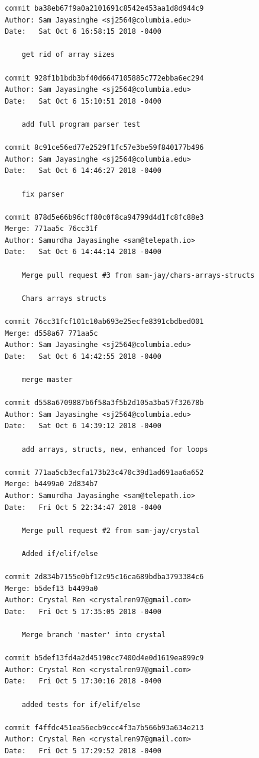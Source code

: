 \documentclass[12pt]{article}
\begin{document}
\begin{lstlisting}
commit ba38eb67f9a0a2101691c8542e453aa1d8d944c9
Author: Sam Jayasinghe <sj2564@columbia.edu>
Date:   Sat Oct 6 16:58:15 2018 -0400

    get rid of array sizes

commit 928f1b1bdb3bf40d6647105885c772ebba6ec294
Author: Sam Jayasinghe <sj2564@columbia.edu>
Date:   Sat Oct 6 15:10:51 2018 -0400

    add full program parser test

commit 8c91ce56ed77e2529f1fc57e3be59f840177b496
Author: Sam Jayasinghe <sj2564@columbia.edu>
Date:   Sat Oct 6 14:46:27 2018 -0400

    fix parser

commit 878d5e66b96cff80c0f8ca94799d4d1fc8fc88e3
Merge: 771aa5c 76cc31f
Author: Samurdha Jayasinghe <sam@telepath.io>
Date:   Sat Oct 6 14:44:14 2018 -0400

    Merge pull request #3 from sam-jay/chars-arrays-structs
    
    Chars arrays structs

commit 76cc31fcf101c10ab693e25ecfe8391cbdbed001
Merge: d558a67 771aa5c
Author: Sam Jayasinghe <sj2564@columbia.edu>
Date:   Sat Oct 6 14:42:55 2018 -0400

    merge master

commit d558a6709887b6f58a3f5b2d105a3ba57f32678b
Author: Sam Jayasinghe <sj2564@columbia.edu>
Date:   Sat Oct 6 14:39:12 2018 -0400

    add arrays, structs, new, enhanced for loops

commit 771aa5cb3ecfa173b23c470c39d1ad691aa6a652
Merge: b4499a0 2d834b7
Author: Samurdha Jayasinghe <sam@telepath.io>
Date:   Fri Oct 5 22:34:47 2018 -0400

    Merge pull request #2 from sam-jay/crystal
    
    Added if/elif/else

commit 2d834b7155e0bf12c95c16ca689bdba3793384c6
Merge: b5def13 b4499a0
Author: Crystal Ren <crystalren97@gmail.com>
Date:   Fri Oct 5 17:35:05 2018 -0400

    Merge branch 'master' into crystal

commit b5def13fd4a2d45190cc7400d4e0d1619ea899c9
Author: Crystal Ren <crystalren97@gmail.com>
Date:   Fri Oct 5 17:30:16 2018 -0400

    added tests for if/elif/else

commit f4ffdc451ea56ecb9ccc4f3a7b566b93a634e213
Author: Crystal Ren <crystalren97@gmail.com>
Date:   Fri Oct 5 17:29:52 2018 -0400


\end{lstlisting}
\end{document}
